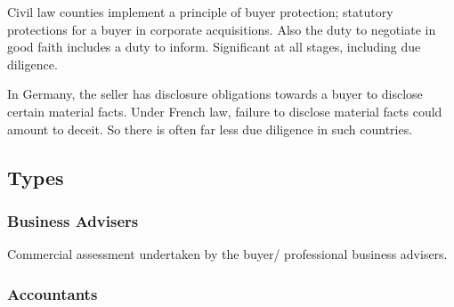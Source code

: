 \documentclass[
]{article}
\begin{document}
Civil law counties implement a principle of buyer protection; statutory
protections for a buyer in corporate acquisitions. Also the duty to
negotiate in good faith includes a duty to inform. Significant at all
stages, including due diligence.

In Germany, the seller has disclosure obligations towards a buyer to
disclose certain material facts. Under French law, failure to disclose
material facts could amount to deceit. So there is often far less due
diligence in such countries.

\hypertarget{types}{%
\subsection{Types}\label{types}}

\hypertarget{business-advisers}{%
\subsubsection{Business Advisers}\label{business-advisers}}

Commercial assessment undertaken by the buyer/ professional business
advisers.

\hypertarget{accountants}{%
\subsubsection{Accountants}\label{accountants}}
\end{document}
